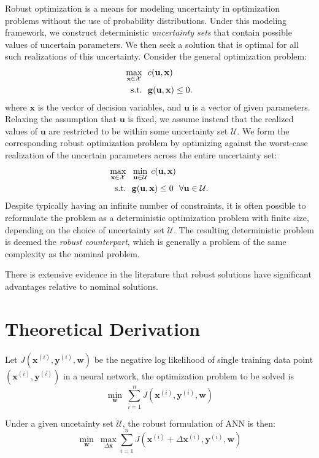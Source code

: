 \documentclass[twoside,12pt]{article}
\newcommand{\M}[1]{\boldsymbol{\mathbf{#1}}}
\newcommand{\V}{\M}
\newcommand{\Cal}{\mathcal}
\begin{document}
Robust optimization is a means for modeling uncertainty in optimization problems without the use of probability distributions.
Under this modeling framework, we construct deterministic \emph{uncertainty sets} that contain possible values of uncertain parameters. We then seek a solution that is optimal for all such realizations of this uncertainty. Consider the general optimization problem:
\[
\begin{aligned}
  \max_{\V x \in \Cal X} ~~ & c(\V u, \V x)\\
  \textup{s.t.} ~~ & \V g (\V u, \V x) \le 0.
\end{aligned}
\]
where $\V x$ is the vector of decision variables, and $\V u$ is a vector of given parameters. Relaxing the assumption that $\V u$ is fixed, we assume instead that the realized values of $\V u$ are restricted to be within some uncertainty set $\Cal U$. We form the corresponding robust optimization problem by optimizing against the worst-case realization of the uncertain parameters across the entire uncertainty set:
\[
\begin{aligned}
  \max_{\V x \in \Cal X} ~~ & \min_{\V u \in \Cal U} \; c(\V u, \V x) \\
  \textup{s.t.} ~~ & \V g (\V u, \V x) \le 0 ~~ \forall \V u \in \Cal U.
\end{aligned}
\]
Despite typically having an infinite number of constraints, it is often possible to reformulate the problem as a deterministic optimization problem with finite size, depending on the choice of uncertainty set $\Cal U$. The resulting deterministic problem is deemed the \emph{robust counterpart}, which is generally a problem of the same complexity as the nominal problem.

There is extensive evidence in the literature that robust solutions have significant advantages relative to nominal solutions.


\section{Theoretical Derivation}

Let $J(\M x^{(i)}, \M y^{(i)}, \M w)$ be the negative log likelihood of single training data point $( \M x^{(i)}, \M y^{(i)} )$ in a neural network, the optimization problem to be solved is
\begin{equation}
\min_{\M w} ~ \sum_{i=1}^n J(\M x^{(i)}, \M y^{(i)}, \M w)
\end{equation}

Under a given uncetainty set $\Cal U$, the robust formulation of ANN is then:
\begin{equation}\label{eq:RANN}
\min_{\M w} ~ \max_{\Delta \M x}  \sum_{i=1}^n J(\M x^{(i)} + \Delta \M x^{(i)}, \M y^{(i)}, \M w)
\end{equation}
\end{document}

